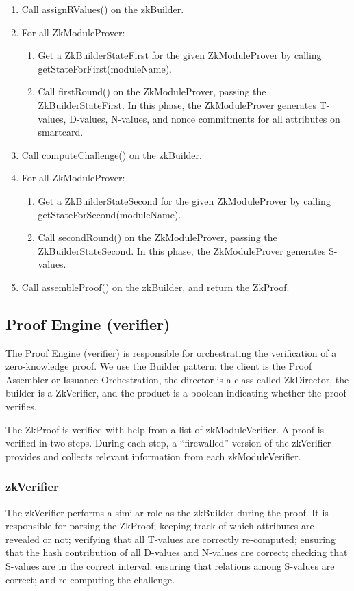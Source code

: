 \begin{enumerate}
    \item Call assignRValues() on the zkBuilder.
    \item For all ZkModuleProver:
      \begin{enumerate}
        \item Get a ZkBuilderStateFirst for the given ZkModuleProver by calling getStateForFirst(moduleName).
        \item Call firstRound() on the ZkModuleProver, passing the ZkBuilderStateFirst. In this phase, the ZkModuleProver generates T-values, D-values, N-values, and nonce commitments for all attributes on smartcard.
      \end{enumerate}

    \item Call computeChallenge() on the zkBuilder.
    \item For all ZkModuleProver:
      \begin{enumerate}
        \item Get a ZkBuilderStateSecond for the given ZkModuleProver by calling getStateForSecond(moduleName).
        \item Call secondRound() on the ZkModuleProver, passing the ZkBuilderStateSecond. In this phase, the ZkModuleProver generates S-values.
      \end{enumerate}

    \item Call assembleProof() on the zkBuilder, and return the ZkProof.
  \end{enumerate}

  \subsection{Proof Engine (verifier)}
  The Proof Engine (verifier) is responsible for orchestrating the verification of a zero-knowledge proof.
  We use the Builder pattern: the client is the Proof Assembler or Issuance Orchestration, the director is a class called ZkDirector,
  the builder is a ZkVerifier, and the product is a boolean indicating whether the proof verifies.

  The ZkProof is verified with help from a list of zkModuleVerifier. A proof is verified in two steps. During each step, a ``firewalled'' version
  of the zkVerifier provides and collects relevant information from each zkModuleVerifier.

  \subsubsection{zkVerifier}
  The zkVerifier performs a similar role as the zkBuilder during the proof.
  It is responsible for parsing the ZkProof; keeping track of which attributes are revealed or not;
  verifying that all T-values
  are correctly re-computed; ensuring that the hash contribution of all D-values and N-values are correct;
  checking that S-values are in the correct interval; ensuring that relations among S-values are correct;
  and re-computing the challenge.

